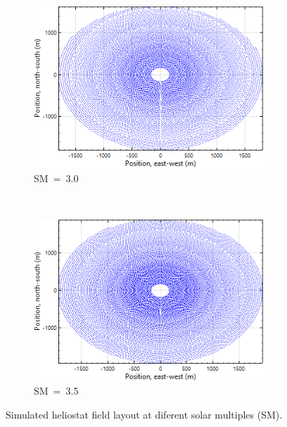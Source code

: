 \documentclass[Master,MEE,english]{twbook}%
\begin{document}
\begin{figure}[!htbp]
\par\medskip %
                
        \begin{subfigure}[b]{0.5\textwidth}
                \centering
                \includegraphics[width=0.95\textwidth]{FIG/SM30}
                \caption{SM~=~3.0}\label{SM3.0}
        \end{subfigure}%
        ~
        \begin{subfigure}[b]{0.5\textwidth}
                \centering
                \includegraphics[width=0.95\textwidth]{FIG/SM35}
                \caption{SM~=~3.5}\label{SM3.5}
        \end{subfigure}
        \caption[Simulated heliostat field layout at diferent solar multiples (SM).]{Simulated heliostat field layout at diferent solar multiples (SM).}\label{SM}
\end{figure}
\end{document}
